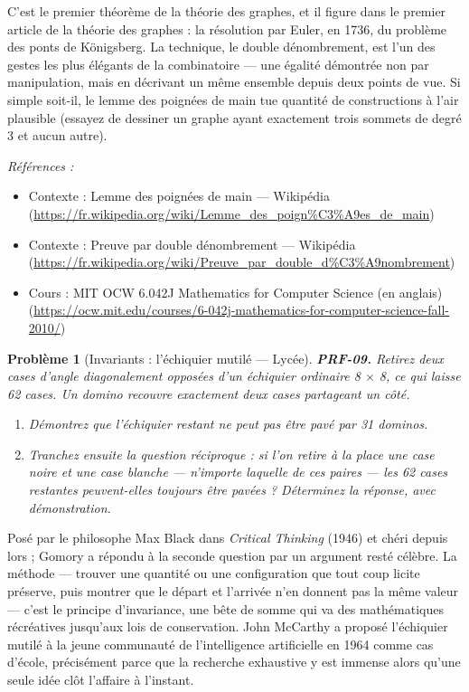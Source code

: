 \documentclass[11pt]{article}
\newtheorem{problem}{Problème}
\newenvironment{refs}{\par\small\noindent\emph{Références :}\begin{itemize}\setlength\itemsep{0pt}}{\end{itemize}\normalsize}
\begin{document}
\noindent C'est le premier théorème de la théorie des graphes, et il figure dans le
premier article de la théorie des graphes : la résolution par Euler, en 1736, du problème des
ponts de Königsberg. La technique, le double dénombrement, est l'un des gestes les plus
élégants de la combinatoire --- une égalité démontrée non par manipulation, mais en décrivant
un même ensemble depuis deux points de vue. Si simple soit-il, le lemme des poignées de main
tue quantité de constructions à l'air plausible (essayez de dessiner un graphe ayant
exactement trois sommets de degré 3 et aucun autre).

\begin{refs}
\item Contexte : Lemme des poignées de main --- Wikipédia (\url{https://fr.wikipedia.org/wiki/Lemme_des_poign%C3%A9es_de_main})
\item Contexte : Preuve par double dénombrement --- Wikipédia (\url{https://fr.wikipedia.org/wiki/Preuve_par_double_d%C3%A9nombrement})
\item Cours : MIT OCW 6.042J Mathematics for Computer Science (en anglais) (\url{https://ocw.mit.edu/courses/6-042j-mathematics-for-computer-science-fall-2010/})
\end{refs}

\bigskip

\begin{problem}[{Invariants : l'échiquier mutilé --- Lycée}]
\textbf{PRF-09.} Retirez deux cases d'angle diagonalement opposées d'un échiquier
ordinaire 8 $\times$ 8, ce qui laisse 62 cases. Un domino recouvre exactement deux cases partageant
un côté.
\begin{enumerate}
\item[(a)] Démontrez que l'échiquier restant ne peut pas être pavé par 31 dominos.
\item[(b)] Tranchez ensuite la question réciproque : si l'on retire à la place une case noire et
une case blanche --- n'importe laquelle de ces paires --- les 62 cases restantes peuvent-elles
toujours être pavées ? Déterminez la réponse, avec démonstration.
\end{enumerate}

\end{problem}

\noindent Posé par le philosophe Max Black dans \textit{Critical Thinking} (1946) et
chéri depuis lors ; Gomory a répondu à la seconde question par un argument resté célèbre. La
méthode --- trouver une quantité ou une configuration que tout coup licite préserve, puis
montrer que le départ et l'arrivée n'en donnent pas la même valeur --- c'est le principe
d'invariance, une bête de somme qui va des mathématiques récréatives jusqu'aux lois de
conservation. John McCarthy a proposé l'échiquier mutilé à la jeune communauté de
l'intelligence artificielle en 1964 comme cas d'école, précisément parce que la recherche
exhaustive y est immense alors qu'une seule idée clôt l'affaire à l'instant.
\end{document}
